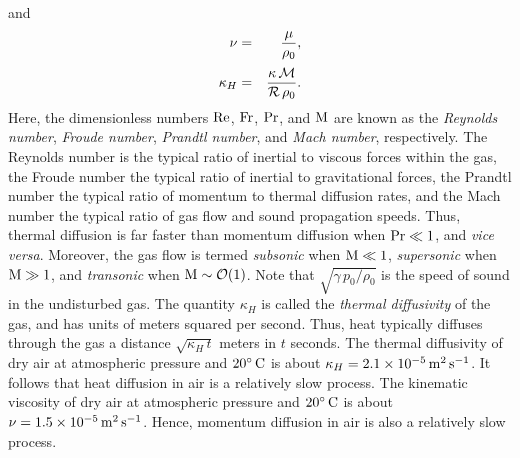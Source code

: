 and
\begin{eqnarray}
\nu &=&\frac{\mu}{\rho_0},\\[0.5ex]
\kappa_H &=& \frac{\kappa\,{\cal M}}{{\cal R}\,\rho_0}.
\end{eqnarray}
Here, the dimensionless numbers ${\rm Re}$, ${\rm Fr}$, ${\rm Pr}$, and ${\rm M}$  are known as the {\em Reynolds number},  
{\em Froude number}, {\em Prandtl number},  and {\em Mach number}, respectively.  The Reynolds number is the typical ratio of inertial to viscous forces within the gas,
the Froude number  the typical ratio of inertial to gravitational forces, the  Prandtl number 
the typical ratio of  momentum   to  thermal diffusion rates, 
and the Mach number the typical ratio of 
gas flow and sound propagation speeds. Thus, thermal diffusion is far faster than momentum diffusion when ${\rm Pr}\ll 1$,
and {\em vice versa}. Moreover, the gas flow is termed {\em subsonic}\/ when ${\rm M}\ll 1$, {\em supersonic}\/ when
${\rm M}\gg 1$, and {\em transonic}\/ when ${\rm M}\sim {\cal O}(1)$. 
Note that $\sqrt{\gamma\,p_0/\rho_0}$ is the speed of sound in the undisturbed gas. 
The quantity $\kappa_H$ is called the {\em thermal diffusivity}\/ of the gas, and has
units of meters squared per second. Thus, heat typically diffuses through the gas a distance $\sqrt{\kappa_H\,t}$ meters in $t$
seconds. 
The thermal diffusivity of dry air at atmospheric
pressure and $20^\circ\,{\rm C}$ is about
$\kappa_H = 2.1\times 10^{-5}\,{\rm m^2\,s^{-1}}$.
It follows that heat diffusion in air is a relatively slow process. 
The kinematic viscosity of dry air at atmospheric pressure and $20^\circ\,{\rm C}$ is
about $\nu= 1.5\times 10^{-5}\,{\rm m^2\,s^{-1}}$.  Hence, momentum diffusion in air
is also a relatively slow process. 

